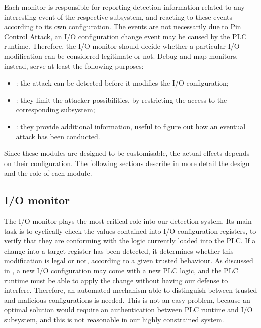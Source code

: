Each monitor is responsible for reporting detection information related to any interesting event of the respective subsystem,
and reacting to these events according to its own configuration. The events are not necessarily due to Pin Control Attack,
\eg an I/O configuration change event may be caused by the PLC runtime.
Therefore, the I/O monitor should decide whether a particular I/O modification can be considered legitimate or not.
Debug and map monitors, instead, serve at least the following purposes:
\begin{itemize}
	\item {}: the attack can be detected before it modifies the I/O configuration;
	\item {}: they limit the attacker possibilities, by restricting the access to the corresponding subsystem;
	\item {}: they provide additional information, useful to figure out how an eventual attack has been conducted.
\end{itemize}
Since these modules are designed to be customisable, the actual effects depends on their configuration.
The following sections describe in more detail the design and the role of each module.


\subsection{I/O monitor}
\label{sec:io-design}

The I/O monitor plays the most critical role into our detection system.
Its main task is to cyclically check the values contained into I/O configuration registers, to verify that they are conforming with the logic currently loaded into the PLC.
If a change into a target register has been detected, it determines whether this modification is legal or not, according to a given trusted behaviour.
As discussed in , a new I/O configuration may come with a new PLC logic, and the PLC runtime must be able to apply the change without
having our defense to interfere.
Therefore, an automated mechanism able to distinguish between trusted and malicious configurations is needed.
This is not an easy problem, because an optimal solution would require an authentication between PLC runtime and I/O subsystem,
and this is not reasonable in our highly constrained system.

